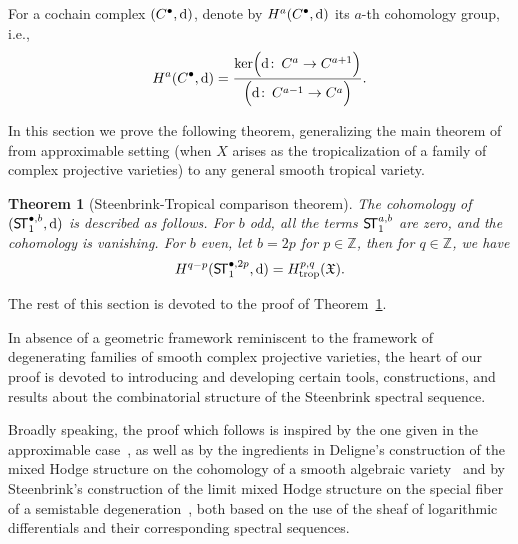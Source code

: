 \documentclass[11pt]{amsart}
\newtheorem{thm}{Theorem}[section]
\theoremstyle{definition}
\numberwithin{equation}{section}
\renewcommand{\~}{\widetilde}
\newcommand{\bul}{\bullet} %
\let\Im\relax
\DeclareMathOperator{\Im}{Im} %
\newcommand{\trop}{\mathrm{trop}} %
\renewcommand{\d}{{\rm d}} %
\newcommand{\X}{\mathfrak X}
\newcommand{\ST}{\textnormal{\textsf{S\!T}}} %
\begin{document}
For a cochain complex $(C^\bul, \d)$, denote by $H^a(C^\bul, \d)$ its $a$-th cohomology group, i.e.,
\[H^a(C^\bul, \d) = \frac{\ker\Bigl(\d\colon \, C^{a} \rightarrow C^{a+1}\Bigr)}{\Im \Bigl(\d\colon \, C^{a-1} \rightarrow C^{a}\Bigr)}. \]

In this section we prove the following theorem, generalizing the main theorem of~\cite{IKMZ} from approximable setting (when $X$ arises as the tropicalization of a family of complex projective varieties) to any general smooth tropical variety.
\begin{thm}[Steenbrink-Tropical comparison theorem] \label{thm:steenbrink}
The cohomology of $(\ST_1^{\bul,b},\d)$ is described as follows. For $b$ odd, all the terms $\ST_1^{a,b}$ are zero, and the cohomology is vanishing. For $b$ even, let $b=2p$ for $p \in \mathbb Z$, then for $q\in \mathbb Z$, we have
\[H^{q-p}(\ST^{\bul,2p}_1, \d) = H^{p,q}_{\trop}(\X).\]
\end{thm}

The rest of this section is devoted to the proof of Theorem~\ref{thm:steenbrink}.

In absence of a geometric framework reminiscent to the framework of degenerating families of smooth complex projective varieties, the heart of our proof is devoted to introducing and developing certain tools, constructions, and results about the combinatorial structure of the Steenbrink spectral sequence.

\medskip

Broadly speaking, the proof which follows is inspired by the one given in the approximable case~\cite{IKMZ}, as well as by the ingredients in Deligne's construction of the mixed Hodge structure on the cohomology of a smooth algebraic variety~\cite{Deligne-Hodge2} and by Steenbrink's construction of the limit mixed Hodge structure on the special fiber of a semistable degeneration~\cite{Ste76}, both based on the use of the sheaf of logarithmic differentials and their corresponding spectral sequences.
\end{document}

